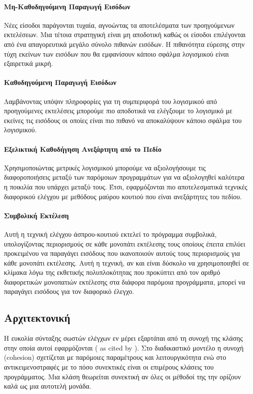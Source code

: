 \documentclass[12pt]{article}
\begin{document}
\paragraph{Μη-Καθοδηγούμενη Παραγωγή Εισόδων}
Νέες είσοδοι παράγονται τυχαία, αγνοώντας τα αποτελέσματα των προηγούμενων εκτελέσεων. Μια τέτοια στρατηγική είναι μη αποδοτική καθώς οι είσοδοι επιλέγονται από ένα απαγορευτικά μεγάλο σύνολο πιθανών εισόδων. Η πιθανότητα εύρεσης στην τύχη εκείνων των εισόδων που θα εμφανίσουν κάποιο σφάλμα λογισμικού είναι εξαιρετικά μικρή.

\paragraph{Καθοδηγούμενη Παραγωγή Εισόδων}
Λαμβάνοντας υπόψιν πληροφορίες για τη συμπεριφορά του λογισμικού από προηγούμενες εκτελέσεις μπορούμε πιο αποδοτικά να ελέγξουμε το λογισμικό με εκείνες τις εισόδους οι οποίες είναι πιο πιθανό να αποκαλύψουν κάποιο σφάλμα του λογισμικού.

\paragraph{Εξελικτική Καθοδήγηση Ανεξάρτητη από το Πεδίο}
Χρησιμοποιώντας μετρικές λογισμικού μπορούμε να αξιολογήσουμε τις διαφοροποιήσεις μεταξύ των παρόμοιων προγραμμάτων για να αξιολογηθεί καλύτερα η ποικιλία που υπάρχει μεταξύ τους. Έτσι, εφαρμόζονται πιο αποτελεσματικά τεχνικές διαφορικού ελέγχου με μεθόδους μαύρου κουτιού που είναι ανεξάρτητες του πεδίου.

\paragraph{Συμβολική Εκτέλεση}
Αυτή η τεχνική ελέγχου άσπρου-κουτιού εκτελεί το πρόγραμμα συμβολικά, υπολογίζοντας περιορισμούς σε κάθε μονοπάτι εκτέλεσης τους οποίους έπειτα επιλύει προκειμένου να παραγάγει εισόδους που ικανοποιούν αυτούς τους περιορισμούς για κάθε μονοπάτι εκτέλεσης. Αυτή η τεχνική, αν και είναι δύσκολο να χρησιμοποιηθεί σε κλίμακα λόγω της εκθετικής πολυπλοκότητας που προκύπτει από τον αριθμό διαφορετικών μονοπατιών εκτέλεσης στα διάφορα παρόμοια προγράμματα, μπορεί να παραγάγει εισόδους για τον διαφορικό έλεγχο.

\subsection{Αρχιτεκτονική}

Η ευκολία σύνταξης σωστών ελέγχων εν μέρει εξαρτάται από τη συνοχή της κλάσης στην οποία αυτοί εφαρμόζονται (\textcite{yeresime} as cited by \textcite{gordon}). Στο διαδικαστικό μοντέλο η συνοχή (cohesion) σχετίζεται με παρόμοιες παραμέτρους και λειτουργικότητα ενώ στο αντικειμενοστραφές με το πόσο συνεκτικές είναι οι επιμέρους κλάσεις του προγράμματος. Μια κλάση θεωρείται συνεκτική αν όλες οι μέθοδοί της την ορίζουν καλά ως μια αυτοτελή μονάδα.
\end{document}
